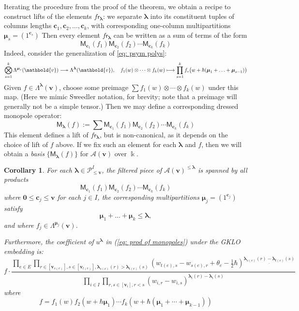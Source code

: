 \documentclass[11pt,reqno]{amsart}
\renewcommand{\mathbf}{\mathbold}
\numberwithin{equation}{section}
\newtheorem{Corollary}[equation]{Corollary}
\theoremstyle{definition}
\newcommand{\cA}{\mathcal{A}}
\newcommand{\cP}{\mathcal{P}}
\newcommand{\bc}{\mathbf{c}}
\newcommand{\bv}{\mathbf{v}}
\newcommand{\twoheadlongrightarrow}{\relbar\joinrel\twoheadrightarrow}
\newcommand{\kk}{\Bbbk}
\renewcommand{\bv}{\mathbf{v}} %
\newcommand{\M}{\mathsf{M}}
\newcommand{\sfr}{{\mathsf{r}}}
\newcommand{\vertexset}{I}
\newcommand{\GT}{\Lambda}
\newcommand{\Partitions}{\cP}
\newcommand{\bla}{{\boldsymbol{\lambda}}}
\newcommand{\bmu}{{\boldsymbol{\mu}}}
\newcommand{\qzast}{\cA}
\begin{document}
Iterating the procedure from the proof of the theorem, we obtain a recipe to construct lifts of the elements $f \sfr_\bla$: we separate $\bla$ into its constituent tuples of columns lengths $\bc_1,\bc_2,\ldots, \bc_k$, with corresponding one-column multipartitions $\bmu_s = (1^{\bc_s})$ Then every element $f \sfr_\bla$ can be written as a sum of terms of the form
\begin{equation}
    \M_{\bc_1}(f_1) \M_{\bc_2}(f_2) \cdots \M_{\bc_k}(f_k)    
\end{equation}
Indeed, consider the generalization of \eqref{eq: psym polys}:
\begin{equation}
     \bigotimes_{s=1}^k \GT^{\bmu_s}(\bv)  \twoheadlongrightarrow \GT^\bla(\bv), \quad f_1(w) \otimes \cdots \otimes f_k(w) \longmapsto  \prod_{s=1}^k f_s\big( w + \hbar(\bmu_1+\ldots+\bmu_{s-1}) \big)
\end{equation}
Given $f \in \GT^\bla(\bv)$,  choose some preimage $\sum f_1(w)\otimes \cdots \otimes f_k(w)$ under this map.  (Here we mimic Sweedler notation, for brevity; note that a preimage will generally not be a simple tensor.)  Then we may define a corresponding  dressed monopole operator:
\begin{equation}
    \label{eq: general MOs}
    \M_\bla(f) := \sum \M_{\bc_1}(f_1) \M_{\bc_2}(f_2) \cdots \M_{\bc_k}(f_k)    
\end{equation}
This element defines a lift of $f \sfr_\bla$, but is non-canonical, as it depends on the choice of lift of $f$ above. If we fix such an element for each $\bla$ and $f$, then we will obtain a \emph{basis} $\{ \M_\bla(f)\}$ for $\qzast(\bv)$ over $\kk$.


\begin{Corollary}
\label{cor: filtration generated by FMOs}
For each $\bla \in \Partitions_{\leq \bv}^\vertexset$, the filtered piece of $\qzast(\bv)^{\leq \bla}$ is spanned by all products 
\begin{equation}
\label{eq: prod of monopoles}
\M_{\bc_1}(f_1) \M_{\bc_2}(f_2) \cdots \M_{\bc_k}(f_k)
\end{equation}
where  $\mathbf{0} \leq \bc_j \leq \bv$ for each $j \in I$, the corresponding multipartitions $\bmu_j = (1^{\bc_j})$ satisfy
$$
\bmu_1 + \ldots + \bmu_k \leq \bla,
$$
and where $f_j \in \GT^{\bmu_j}(\bv)$.

Furthermore, the coefficient of $u^\bla$ in (\ref{eq: prod of monopoles}) under the GKLO embedding is:
\begin{equation} 
  \label{eq:20}
  f \cdot \frac{\prod_{e \in E} \prod_{r \in [\bv_{s(e)}],s \in [\bv_{t(e)}], \bla_{s(e)}(r) > \bla_{t(e)}(s)} (w_{t(e),s} - w_{s(e),r} + \theta_e - \tfrac{1}{2} \hbar)^{\underline{\bla_{s(e)}(r) - \bla_{t(e)}(s)}} }{\prod_{i \in I} \prod_{r,s \in [\bv_i], r < s} (w_{i,r} - w_{i,s} )^{\overline{\bla_i(r) - \bla_i(s)} }}
\end{equation}
where
\begin{equation}
  \label{eq:21}
  f = f_1(w) f_2(w + \hbar \bmu_1) \cdots f_k(w + \hbar (\bmu_1 + \cdots + \bmu_{k-1}) ) 
\end{equation}

\end{Corollary}
\end{document}
